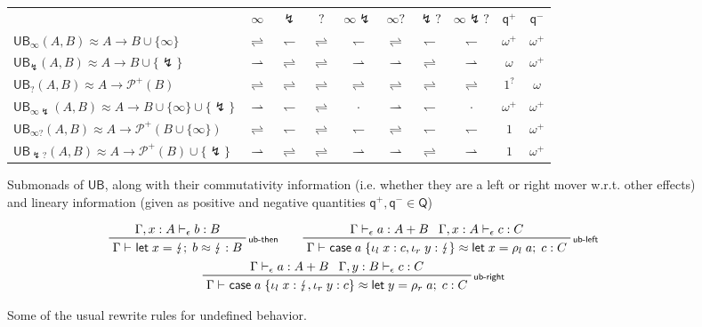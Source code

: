 \documentclass[acmsmall,screen,review]{acmart}
\newcommand{\mc}[1]{\ensuremath{\mathcal{#1}}}
\newcommand{\ms}[1]{\ensuremath{\mathsf{#1}}}
\newcommand{\lto}{:}
\newcommand{\linl}[1]{\iota_l\;{#1}}
\newcommand{\linr}[1]{\iota_r\;{#1}}
\newcommand{\letexpr}[3]{\ensuremath{\ms{let}\;#1 = #2;\;#3}}
\newcommand{\caseexpr}[5]{\ms{case}\;#1\;\{\linl{#2} \lto #3, \linr{#4} \lto #5\}}
\newcommand{\rle}[1]{{\scriptsize\textsf{#1}}}
\newcommand{\hasty}[4]{#1 \vdash_{#2} #3: {#4}}
\newcommand{\teqv}{\approx}
\newcommand{\tmeq}[5]{#1 \vdash_{#2} #3 \teqv #4 : {#5}}
\newcommand{\rightmove}{\rightharpoonup}
\newcommand{\leftmove}{\leftharpoondown}
\newcommand{\slides}{\rightleftharpoons}
\newcommand{\oneq}{1}
\newcommand{\delq}{1^?}
\newcommand{\cpyq}{\omega^+}
\newcommand{\topq}{\omega}
\newcommand{\ubeff}{\lightning}
\begin{document}
\begin{figure}
  \begin{tabular}{l|ccccccccc}
    & $\infty$ & $\ubeff$ & $?$ & $\infty\ubeff$ & $\infty?$ & $\ubeff?$ & $\infty\ubeff?$ 
    & $\ms{q}^+$ & $\ms{q}^-$ \\
    $\ms{UB}_\infty(A, B) \approx A \to B \cup \{\infty\}$ 
    & $\slides$ & $\leftmove$ & $\slides$ & $\leftmove$ & $\slides$ & $\leftmove$ & $\leftmove$ 
    & $\cpyq$ & $\cpyq$ \\ 
    $\ms{UB}_\ubeff(A, B) \approx A \to B \cup \{\ubeff\}$ 
    & $\rightmove$ & $\slides$ & $\slides$ & $\rightmove$ & $\rightmove$ & $\slides$ & $\rightmove$ 
    & $\topq$ & $\cpyq$ \\
    $\ms{UB}_?(A, B) \approx A \to \mc{P}^+(B)$
    & $\slides$ & $\slides$ & $\slides$ & $\slides$ & $\slides$ & $\slides$ & $\slides$ 
    & $\delq$ & $\topq$ \\
    $\ms{UB}_{\infty\ubeff}(A, B) \approx A \to B \cup \{\infty\} \cup \{\ubeff\}$ 
    & $\rightmove$ & $\leftmove$ & $\slides$ & $\cdot$ & $\rightmove$  & $\leftmove$ & $\cdot$ 
    & $\cpyq$ & $\cpyq$ \\
    $\ms{UB}_{\infty?}(A, B) \approx A \to \mc{P}^+(B \cup \{\infty\})$ 
    & $\slides$ & $\leftmove$ & $\slides$ & $\leftmove$ & $\slides$ & $\leftmove$ & $\leftmove$ 
    & $\oneq$ & $\cpyq$ \\ 
    $\ms{UB}_{\ubeff?}(A, B) \approx A \to \mc{P}^+(B) \cup \{\ubeff\}$ 
    & $\rightmove$ & $\slides$ & $\slides$ & $\rightmove$ & $\rightmove$ & $\slides$ & $\rightmove$ 
    & $\oneq$ & $\cpyq$ \\
  \end{tabular}
  \caption{
    Submonads of $\ms{UB}$, along with their commutativity information 
    (i.e. whether they are a left or right mover w.r.t. other effects) and lineary information
    (given as positive and negative quantities $\ms{q}^+, \ms{q}^- \in \ms{Q}$)
  }
  \Description{}
  \label{fig:ub-submonads}
\end{figure}

\begin{figure}
  \begin{adjustbox}{minipage=1.1\textwidth,scale=0.9}
  \begin{gather*}
    \prftree[r]{\rle{ub-then}}
      {\hasty{\Gamma, x : A}{\epsilon}{b}{B}}
      {\tmeq{\Gamma}{}{\letexpr{x}{\ubeff}{b}}{\ubeff}{B}} \qquad
    \prftree[r]{\rle{ub-left}}
      {\hasty{\Gamma}{\epsilon}{a}{A + B}}
      {\hasty{\Gamma, x : A}{\epsilon}{c}{C}}
      {\tmeq{\Gamma}{}{\caseexpr{a}{x}{c}{y}{\ubeff}}{\letexpr{x}{\rho_l\;a}{c}}{C}}
    \\
    \prftree[r]{\rle{ub-right}}
      {\hasty{\Gamma}{\epsilon}{a}{A + B}}
      {\hasty{\Gamma, y : B}{\epsilon}{c}{C}}
      {\tmeq{\Gamma}{}{\caseexpr{a}{x}{\ubeff}{y}{c}}{\letexpr{y}{\rho_r\;a}{c}}{C}}
  \end{gather*}
  \end{adjustbox}
  \caption{
    Some of the usual rewrite rules for undefined behavior.
  }
  \Description{}
  \label{fig:ub-rewrites}
\end{figure}
\end{document}
